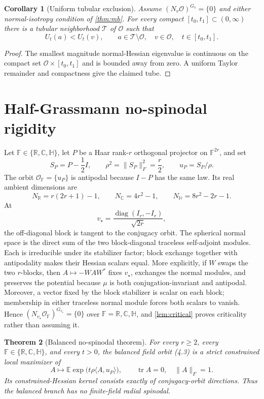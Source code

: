 \documentclass[11pt]{article}
\newtheorem{theorem}{Theorem}[section]
\newtheorem{corollary}[theorem]{Corollary}
\newcommand{\E}{\mathbb E}
\newcommand{\R}{\mathbb R}
\newcommand{\C}{\mathbb C}
\newcommand{\Hh}{\mathbb H}
\newcommand{\tr}{\operatorname{tr}}
\newcommand{\cO}{\mathcal O}
\newcommand{\ip}[2]{\langle #1,#2\rangle}
\newcommand{\norm}[1]{\lVert #1\rVert}
\begin{document}
\begin{corollary}[Uniform tubular exclusion]\label{cor:tube}
Assume $(N_v\cO)^{G_v}=\{0\}$ and either normal-isotropy condition of
\cref{thm:mb}.  For every compact $[t_0,t_1]\subset(0,\infty)$ there is a tubular
neighborhood $\mathcal T$ of $\cO$ such that
\[
 U_t(a)<U_t(v),\qquad
 a\in\mathcal T\setminus\cO,\quad v\in\cO,\quad t\in[t_0,t_1].           \tag{3.3}
\]
\end{corollary}

\begin{proof}
The smallest magnitude normal-Hessian eigenvalue is continuous on the
compact set $\cO\times[t_0,t_1]$ and is bounded away from zero.  A uniform
Taylor remainder and compactness give the claimed tube.
\end{proof}

\section{Half-Grassmann no-spinodal rigidity}

Let $\mathbb F\in\{\R,\C,\Hh\}$, let $P$ be a Haar rank-$r$ orthogonal
projector on $\mathbb F^{2r}$, and set
\[
 S_P=P-\frac12I,\qquad \rho^2=\norm{S_P}_F^2=\frac r2,\qquad
 u_P=S_P/\rho.                                               \tag{4.1}
\]
The orbit $\cO_{\mathbb F}=\{u_P\}$ is antipodal because $I-P$ has the same
law.  Its real ambient dimensions are
\[
 N_{\R}=r(2r+1)-1,\qquad N_{\C}=4r^2-1,\qquad
 N_{\Hh}=8r^2-2r-1.                                         \tag{4.2}
\]
At
\[
 v_\star=\frac{\operatorname{diag}(I_r,-I_r)}{\sqrt{2r}},                  \tag{4.3}
\]
the off-diagonal block is tangent to the conjugacy orbit.  The spherical
normal space is the direct sum of the two block-diagonal traceless
self-adjoint modules.  Each is irreducible under its stabilizer factor; block
exchange together with antipodality makes their Hessian scalars equal.  More
explicitly, if $W$ swaps the two $r$-blocks, then
$A\mapsto-WAW^*$ fixes $v_\star$, exchanges the normal modules, and preserves
the potential because $\mu$ is both conjugation-invariant and antipodal.
Moreover, a vector fixed by the block stabilizer is scalar on each block;
membership in either traceless normal module forces both scalars to vanish.
Hence $(N_{v_\star}\cO_{\mathbb F})^{G_{v_\star}}=\{0\}$ over
$\mathbb F=\R,\C,\Hh$, and \cref{lem:critical} proves criticality rather than
assuming it.

\begin{theorem}[Balanced no-spinodal theorem]\label{thm:grass}
For every $r\ge2$, every $\mathbb F\in\{\R,\C,\Hh\}$, and every $t>0$, the
balanced field orbit (4.3) is a strict constrained local maximizer of
\[
 A\longmapsto \E\exp\!\bigl(t\rho\ip{A}{u_P}\bigr),
 \qquad \tr A=0,\quad\norm A_F=1.                           \tag{4.4}
\]
Its constrained-Hessian kernel consists exactly of conjugacy-orbit
directions.  Thus the balanced branch has no finite-field radial spinodal.
\end{theorem}
\end{document}
